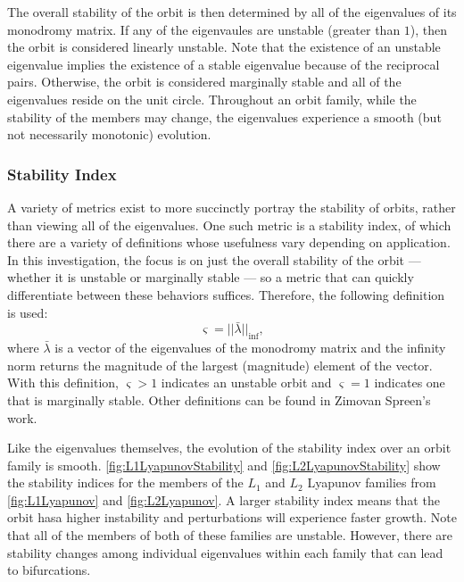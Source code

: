 The overall stability of the orbit is then determined by all of the eigenvalues of its monodromy
matrix. If any of the eigenvaules are unstable (greater than $1$), then the orbit is considered
linearly unstable. Note that the existence of an unstable eigenvalue implies the existence of a
stable eigenvalue because of the reciprocal pairs. Otherwise, the orbit is considered marginally
stable and all of the eigenvalues reside on the unit circle. Throughout an orbit family, while the
stability of the members may change, the eigenvalues experience a smooth (but not necessarily
monotonic) evolution.

\subsubsection{Stability Index}
A variety of metrics exist to more succinctly portray the stability of orbits, rather than viewing
all of the eigenvalues. One such metric is a stability index, of which there are a variety of
definitions whose usefulness vary depending on application. In this investigation, the focus is on
just the overall stability of the orbit --- whether it is unstable or marginally stable --- so a
metric that can quickly differentiate between these behaviors suffices. Therefore, the following
definition is used\cite{Power:2019}:
\begin{equation}
    \varsigma=||\bar{\lambda}||_{\inf},
    \label{eq:stabilityindex}
\end{equation}
where $\bar{\lambda}$ is a vector of the eigenvalues of the monodromy matrix and the infinity norm
returns the magnitude of the largest (magnitude) element of the vector. With this definition,
$\varsigma>1$ indicates an unstable orbit and $\varsigma=1$ indicates one that is marginally
stable. Other definitions can be found in Zimovan Spreen's work\cite{ZimovanSpreen:2021}.

Like the eigenvalues themselves, the evolution of the stability index over an orbit family is
smooth. \cref{fig:L1LyapunovStability} and \cref{fig:L2LyapunovStability} show the stability
indices for the members of the $L_{1}$ and $L_{2}$ Lyapunov families from \cref{fig:L1Lyapunov} and
\cref{fig:L2Lyapunov}. A larger stability index means that the orbit hasa higher instability and
perturbations will experience faster growth. Note that all of the members of both of these families
are unstable. However, there are stability changes among individual eigenvalues within each family
that can lead to bifurcations.

